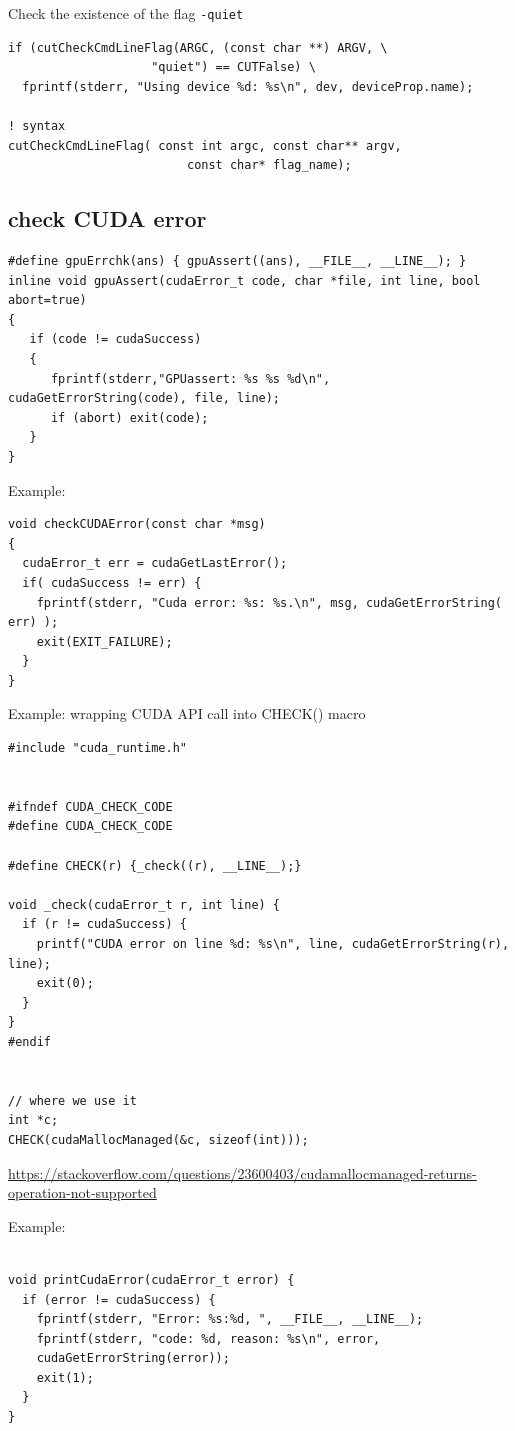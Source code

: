 Check the existence of the flag \verb!-quiet!
\begin{lstlisting}
if (cutCheckCmdLineFlag(ARGC, (const char **) ARGV, \
                    "quiet") == CUTFalse) \
  fprintf(stderr, "Using device %d: %s\n", dev, deviceProp.name);

! syntax
cutCheckCmdLineFlag( const int argc, const char** argv, 
                         const char* flag_name);
\end{lstlisting}

\subsection{check CUDA error}
\label{sec:cudaGetErrorString}

\begin{verbatim}
#define gpuErrchk(ans) { gpuAssert((ans), __FILE__, __LINE__); }
inline void gpuAssert(cudaError_t code, char *file, int line, bool abort=true)
{
   if (code != cudaSuccess) 
   {
      fprintf(stderr,"GPUassert: %s %s %d\n", cudaGetErrorString(code), file, line);
      if (abort) exit(code);
   }
}

\end{verbatim}

Example:
\begin{lstlisting}
void checkCUDAError(const char *msg)
{
  cudaError_t err = cudaGetLastError();
  if( cudaSuccess != err) {
    fprintf(stderr, "Cuda error: %s: %s.\n", msg, cudaGetErrorString( err) );
    exit(EXIT_FAILURE);
  }                         
}
\end{lstlisting}

Example: wrapping CUDA API call into CHECK() macro

\begin{verbatim}
#include "cuda_runtime.h"


#ifndef CUDA_CHECK_CODE
#define CUDA_CHECK_CODE

#define CHECK(r) {_check((r), __LINE__);}

void _check(cudaError_t r, int line) {
  if (r != cudaSuccess) {
    printf("CUDA error on line %d: %s\n", line, cudaGetErrorString(r), line);
    exit(0);
  }
}
#endif


// where we use it
int *c;
CHECK(cudaMallocManaged(&c, sizeof(int)));

\end{verbatim}
\url{https://stackoverflow.com/questions/23600403/cudamallocmanaged-returns-operation-not-supported}

Example:
\begin{verbatim}

void printCudaError(cudaError_t error) {
  if (error != cudaSuccess) {
    fprintf(stderr, "Error: %s:%d, ", __FILE__, __LINE__);
    fprintf(stderr, "code: %d, reason: %s\n", error,
    cudaGetErrorString(error));
    exit(1);
  }
}
\end{verbatim}

